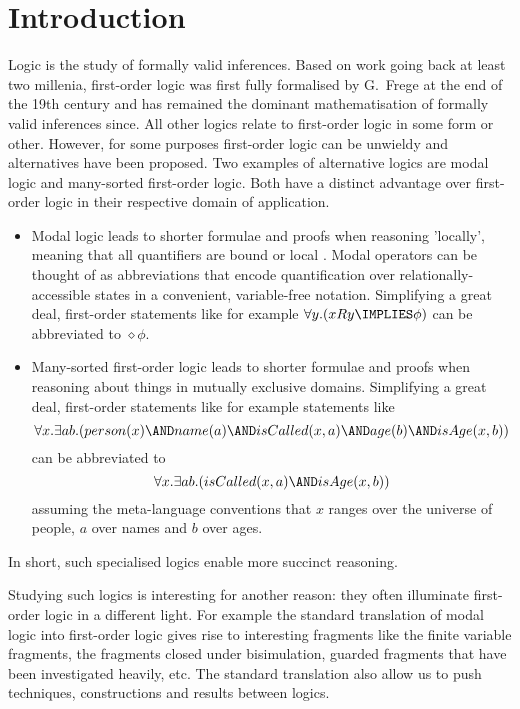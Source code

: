 \section{Introduction}\label{introduction}

\NI Logic is the study of formally valid inferences. Based on work
going back at least two millenia, first-order logic was first fully
formalised by G.~Frege at the end of the 19th century
\cite{FregeG:begriffsschrift} and has remained the dominant
mathematisation of formally valid inferences since.  All other logics
relate to first-order logic in some form or other. However, for some
purposes first-order logic can be unwieldy and alternatives have been
proposed. Two examples of alternative logics are modal logic and
many-sorted first-order logic.  Both have a distinct advantage over
first-order logic in their respective domain of application.

\begin{itemize}

\item Modal logic leads to shorter formulae and proofs when reasoning
  'locally', meaning that all quantifiers are bound or local
  \cite{BlackburnP:modlog}. Modal operators can be thought of as
  abbreviations that encode quantification over
  relationally-accessible states in a convenient, variable-free
  notation.  Simplifying a great deal, first-order statements like for
  example $\forall y. ( x R y \IMPLIES \phi)$ can be abbreviated to
  $\diamond \phi$.

\item Many-sorted first-order logic leads to shorter formulae and
  proofs when reasoning about things in mutually exclusive domains.
  Simplifying a great deal, first-order statements like for example
  statements like
\[
     \forall x. \exists ab.( person(x) \AND name (a) \AND isCalled( x, a ) \AND age(b) \AND isAge(x,b))
\]
can be abbreviated to
\[
     \forall x. \exists ab.( isCalled( x, a ) \AND isAge(x,b))
\]
assuming the meta-language conventions that $x$ ranges over the
universe of people, $a$ over names and $b$ over ages.

\end{itemize}

\NI In short, such specialised logics enable more succinct reasoning.

Studying such logics is interesting for another reason: they often
illuminate first-order logic in a different light. For example the
standard translation of modal logic into first-order logic gives rise
to interesting fragments like the finite variable fragments, the
fragments closed under bisimulation, guarded fragments that have been
investigated heavily, etc. The standard translation also allow us to
push techniques, constructions and results between logics.


